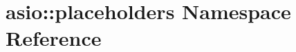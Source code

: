 \hypertarget{namespaceasio_1_1placeholders}{}\section{asio\+:\+:placeholders Namespace Reference}
\label{namespaceasio_1_1placeholders}
